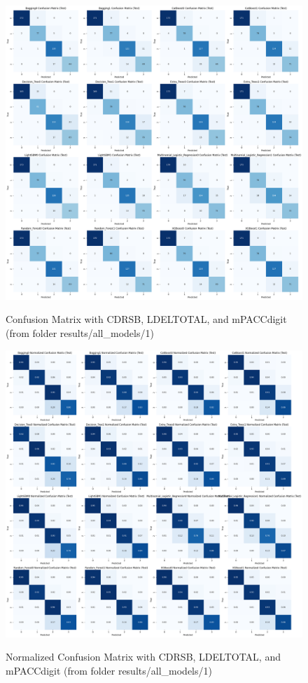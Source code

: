 \begin{figure}[H]
	\centering
	\includegraphics[width=1\textwidth]{images/1_Confusion_Matrix.png}
	\label{fig:Confusion Matrix with CDRSB, LDELTOTAL, and mPACCdigit}
	\caption{Confusion Matrix with CDRSB, LDELTOTAL, and mPACCdigit (from folder results/all\_models/1)}
\end{figure} 

\newpage

\begin{figure}[H]
	\centering
	\includegraphics[width=1\textwidth]{images/1_Confusion_Matrix_Normalized.png}
	\label{fig:Normalized Confusion Matrix with CDRSB, LDELTOTAL, and mPACCdigit}
	\caption{Normalized Confusion Matrix with CDRSB, LDELTOTAL, and mPACCdigit (from folder results/all\_models/1)}
\end{figure}

